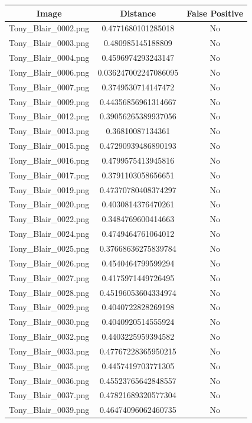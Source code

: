 \documentclass[12pt]{article}
\begin{document}
\begin{center}
\begin{tabular}{ccc}
Image & Distance & False Positive \\
\hline
Tony\_Blair\_0002.png & 0.4771680101285018 & No \\
Tony\_Blair\_0003.png & 0.480985145188809 & No\\
Tony\_Blair\_0004.png & 0.4596974293243147 & No\\
Tony\_Blair\_0006.png & 0.036247002247086095 & No\\
Tony\_Blair\_0007.png & 0.3749530714147472 & No\\
Tony\_Blair\_0009.png & 0.44356856961314667 & No\\
Tony\_Blair\_0012.png & 0.39056265389937056 & No\\
Tony\_Blair\_0013.png & 0.36810087134361 & No\\
Tony\_Blair\_0015.png & 0.47290939486890193 & No\\
Tony\_Blair\_0016.png & 0.4799575413945816 & No\\
Tony\_Blair\_0017.png & 0.3791103058656651 & No\\
Tony\_Blair\_0019.png & 0.47370780408374297 & No\\
Tony\_Blair\_0020.png & 0.4030814376470261 & No\\
Tony\_Blair\_0022.png & 0.3484769600414663 & No\\
Tony\_Blair\_0024.png & 0.4749464761064012 & No\\
Tony\_Blair\_0025.png & 0.37668636275839784 & No\\
Tony\_Blair\_0026.png & 0.4540464799599294 & No\\
Tony\_Blair\_0027.png & 0.4175971449726495 & No\\
Tony\_Blair\_0028.png & 0.45196053604334974 & No\\
Tony\_Blair\_0029.png & 0.4040722828269198 & No\\
Tony\_Blair\_0030.png & 0.4040920514555924 & No\\
Tony\_Blair\_0032.png & 0.4403225959394582 & No\\
Tony\_Blair\_0033.png & 0.47767228365950215 & No\\
Tony\_Blair\_0035.png & 0.4457419703771305 & No\\
Tony\_Blair\_0036.png & 0.45523765642848557 & No\\
Tony\_Blair\_0037.png & 0.47821689320577304 & No\\
Tony\_Blair\_0039.png & 0.46474096062460735 & No\\

\end{tabular}
\end{center}
\end{document}

